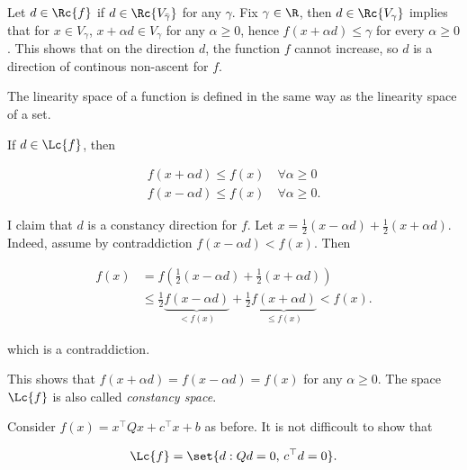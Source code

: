 \begin{remark}
    
    Let $d \in \Rc{f}$ if $d \in \Rc{V_{\bar{\gamma}}}$ for any $\gamma$. Fix $\gamma \in \R$, then $d \in \Rc{V_\gamma}$ implies that for $x \in V_{\gamma}$, $x + \alpha d \in V_\gamma$ for any $\alpha \geq 0$, hence $f(x + \alpha d) \le \gamma$ for every $\alpha \geq 0$. This shows that on the direction $d$, the function $f$ cannot increase, so $d$ is a direction of continous non-ascent for $f$.

\end{remark}

\begin{definition}

    The linearity space of a function is defined in the same way as the linearity space of a set.
    
\end{definition}

\begin{remark}
    
    If $d \in \Lc{f}$, then 

    \begin{align*}
        f(x + \alpha d) \le f(x) \quad \forall \alpha \ge 0 \\
        f(x - \alpha d) \le f(x) \quad \forall \alpha \ge 0.
    \end{align*}

    I claim that $d$ is a constancy direction for $f$. Let $x = \frac12 (x - \alpha d) + \frac12 (x + \alpha d)$. Indeed, assume by contraddiction $f(x - \alpha d) < f(x)$. Then 
    
    \begin{align*}
        f(x) &= f\left(\frac12 (x - \alpha d) + \frac12 (x + \alpha d)\right) \\
            &\le \frac12 \underbrace{f(x - \alpha d)}_{< f(x)} + \frac12 \underbrace{f(x + \alpha d)}_{\le f(x)} < f(x).
    \end{align*}

    which is a contraddiction.

    This shows that $f(x + \alpha d) = f(x - \alpha d) = f(x)$ for any $\alpha \ge 0$. The space $\Lc{f}$ is also called \emph{constancy space}.

\end{remark}

\begin{example}
    
    Consider $f(x)= x^\top Q x + c^\top x + b$ as before. It is not difficoult to show that 

    \[ \Lc{f} = \set{d : Qd = 0,\, c^\top d = 0}. \]

\end{example}

